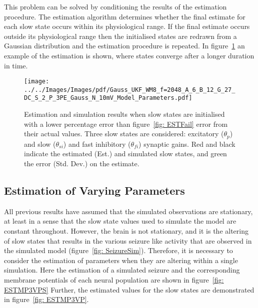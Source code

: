 This problem can be solved by conditioning the results of the estimation procedure. The estimation algorithm determines whether the final estimate for each slow state occurs within its physiological range. If the final estimate occurs outside its physiological range then the initialised states are redrawn from a Gaussian distribution and the estimation procedure is repeated. In figure~\ref{fig: EstInitPass} an example of the estimation is shown, where states converge after a longer duration in time.
\begin{figure}%
	\centering
		\texttt{[image: ../../Images/Images/pdf/Gauss\_UKF\_WM8\_f=2048\_A\_6\_B\_12\_G\_27\_DC\_S\_2\_P\_3PE\_Gauss\_N\_10mV\_Model\_Parameters.pdf]}
	\caption{Estimation and simulation results when slow states are initialised with a lower percentage error than figure~\ref{fig: ESTFail} error from their actual values. Three slow states are considered: excitatory ($\theta_{p}$) and slow ($\theta_{si}$) and fast inhibitory ($\theta_{fi}$) synaptic gains. Red and black indicate the estimated (Est.) and simulated slow states, and green the error (Std. Dev.) on the estimate.}
	\label{fig: EstInitPass}
\end{figure}%

\subsection{Estimation of Varying Parameters}

All previous results have assumed that the simulated observations are stationary, at least in a sense that the slow state values used to simulate the model are constant throughout. However, the brain is not stationary, and it is the altering of slow states that results in the various seizure like activity that are observed in the simulated model (figure~\ref{fig: SeizureSim}). Therefore, it is necessary to consider the estimation of parameters when they are altering within a single simulation. Here the estimation of a simulated seizure and the corresponding membrane potentials of each neural population are shown in figure~\ref{fig: ESTMP3VPS} Further, the estimated values for the slow states are demonstrated in figure~\ref{fig: ESTMP3VP}.

